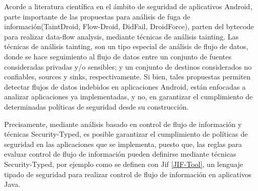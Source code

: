Acorde a literatura científica en el ámbito de seguridad de aplicativos
Android, parte importante de las propuestas para análisis de fuga de
información(TaintDroid\cite{TaintDroid}, Flow-Droid\cite{FlowDroid-Thesis},
DidFail\cite{DidFail}, DroidForce\cite{DroidForce}), parten del bytecode para
realizar data-flow analysis, mediante técnicas de análisis tainting. Las
técnicas de análisis tainting, son un tipo especial de análisis de flujo de
datos, donde se hace seguimiento al flujo de datos entre un conjunto de fuentes
consideradas privadas y/o sensibles; y un conjunto de destinos considerados no
confiables, sources y sinks, respectivamente.\newline 
Si bien, tales propuestas permiten detectar flujos de datos indebidos en
aplicaciones Android, están enfocadas a analizar aplicaciones ya implementadas,
y no, en garantizar el cumplimiento de determinadas políticas de seguridad desde
su construcción.
% 

Precisamente, mediante análisis basado en control de flujo de información y
técnicas Security-Typed, es posible garantizar el cumplimiento de políticas de
seguridad en las aplicaciones que se implementa, puesto que,
las reglas para evaluar control de flujo de
información pueden definirse mediante técnicas Security-Typed, por ejemplo como
se definen con Jif \ref{JIF-Tool}, un lenguaje tipado de seguridad para realizar
control de flujo de información en aplicativos Java.
% 
